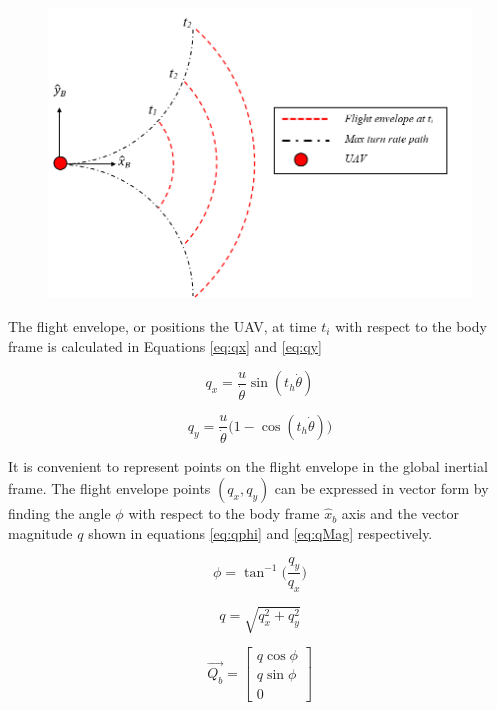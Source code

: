 \documentclass[conf]{new-aiaa}
\begin{document}
\begin{figure}[H]
	\centering
	\includegraphics[width=0.7\linewidth]{Figures/methods/flightEnvelope2}
	\caption{}
	\label{fig:flightenvelope2}
\end{figure}

The flight envelope, or positions the UAV, at time $t_i$ with respect to the body frame is calculated in Equations \ref{eq:qx} and \ref{eq:qy}

\begin{equation}
\label{eq:qx}
q_x =  \frac{u}{\dot{\theta}} \sin(t_h \dot{\theta})
\end{equation}

\begin{equation}
\label{eq:qy}
q_y =  \frac{u}{\dot{\theta}} \big(1-\cos(t_h \dot{\theta})\big)
\end{equation}

It is convenient to represent points on the flight envelope in the global inertial frame. The flight envelope points $(q_x,q_y)$ can be expressed in vector form by finding the angle $\phi$ with respect to the body frame $\hat{x}_b$ axis and the vector magnitude $q$ shown in equations \ref{eq:qphi} and \ref{eq:qMag} respectively.




\begin{equation}
\label{eq:qphi}
\phi = \tan^{-1} \bigg( \frac{q_y}{q_x} \bigg)
\end{equation}

\begin{equation}
\label{eq:qMag}
q = \sqrt{q_x^2 +q_y^2}
\end{equation}



\begin{equation}
\label{eq:pos}
\overrightarrow{Q_b} = \begin{bmatrix}
	q\cos\phi \\
	q\sin\phi \\
	0
\end{bmatrix}
\end{equation}
\end{document}
